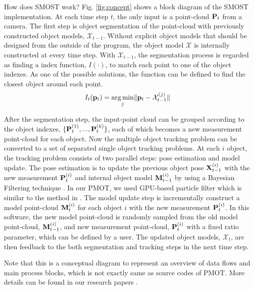 \documentclass[a4paper,twoside, openright,12pt]{report}
\begin{document}
How does SMOST work? Fig. \ref{fig:concept} shows a block diagram of the SMOST implementation. 
At each time step $t$, the only input is a point-cloud ${\bf{P}}_t$ from a camera. The first step is object segmentation of the point-cloud with previously constructed object models, ${\mathcal{X}}_{t-1}$. Without explicit object models that should be designed from the outside of the program, the object model ${\mathcal{X}}$ is internally constructed at every time step. 
With ${\mathcal{X}}_{t-1}$, the segmentation process is regarded as finding a index function, $I(\cdot)$, to match each point to one of the object indexes. As one of the possible solutions, the function can be defined to find the closest object around each point. 
\begin{equation}
I_t({\bf{p}}_{t})=\underset{j}{\arg\min}\lVert{\bf{p}}_{t}-{\mathcal{X}}_{t-1}^{(j)}\rVert
\end{equation} 

After the segmentation step, the input-point cloud can be grouped according to the object indexes, $\{{\bf{P}}_{t}^{(1)},...,{\bf{P}}_{t}^{(k)}\}$, each of which becomes a new measurement point-cloud for each object. Now the multiple object tracking problem can be converted to a set of separated single object tracking problems. At each $i$ object, the tracking problem consists of two parallel steps: pose estimation and model update. The pose estimation is to update the previous object pose ${\bf{X}}_{t-1}^{(i)}$ with the new measurement ${\bf{P}}_{t}^{(i)}$ and internal object model ${\bf{M}}_{t-1}^{(i)}$ by using a Bayesian Filtering technique \cite{li2015realtime}. In our PMOT, we used GPU-based particle filter which is similar to the method in \cite{choi2013rgb}.
The model update step is incrementally construct a model point-cloud ${\bf{M}}_t^{(i)}$ for each object $i$ with the new measurement ${\bf{P}}_{t}^{(i)}$. In this software, the new model point-cloud is randomly sampled from the old model point-cloud, ${\bf{M}}_{t-1}^{(i)}$, and new measurement point-cloud, ${\bf{P}}_{t}^{(i)}$ with a fixed ratio parameter, which can be defined by a user.
The updated object models, ${\mathcal{X}}_{t}$, are then feedback to the both segmentation and tracking steps in the next time step. 
  
Note that this is a conceptual diagram to represent an overview of data flows and main process blocks, which is not exactly same as source codes of PMOT. More details can be found in our research papers \cite{li2015realtime, koo2014unsupervised, koo2014incremental, koo2013multiple, koo2013imft, koo2013gmm}.
\end{document}

